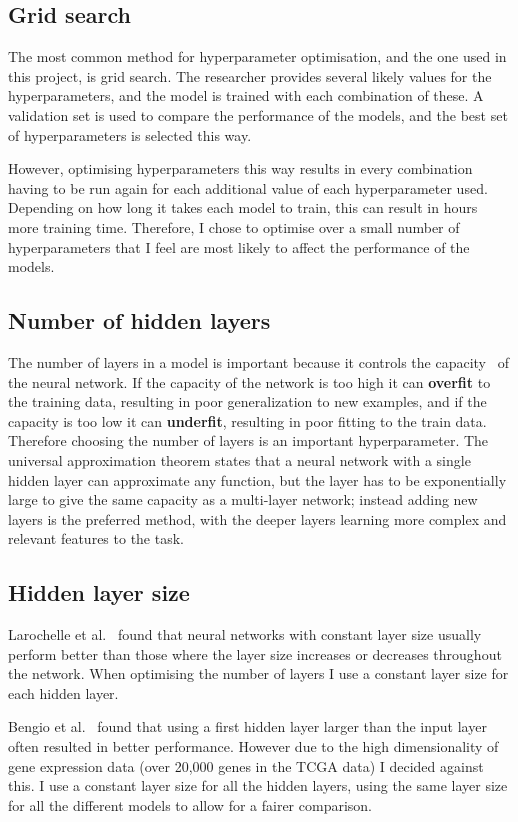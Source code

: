 \documentclass[12pt,a4paper,twoside,openright]{report}
\begin{document}
\subsection{Grid search}
The most common method for hyperparameter optimisation, and the one used in this project, is grid search. The researcher provides several 
likely values for the hyperparameters, and the model is trained with each combination of these. A validation set is used to compare the
performance of the models, and the best set of hyperparameters is selected this way.

However, optimising hyperparameters this way results in every combination having to be run again for each additional value of each
hyperparameter used. Depending on how long it takes each model to train, this can result in hours more training time. 
Therefore, I chose to optimise over a small number of hyperparameters that I feel are most likely to affect the performance of the models.

\subsection{Number of hidden layers}
The number of layers in a model is important because it controls the capacity~\cite{Goodfellow-et-al-2016} of the neural network. If the 
capacity of the network is too high it can \textbf{overfit} to the training data, resulting in poor generalization to new examples, and if the capacity is 
too low it can \textbf{underfit}, resulting in poor fitting to the train data. Therefore choosing the number of layers is an important hyperparameter.
The universal approximation theorem states that a neural network with a single hidden layer can approximate any function, but the layer 
has to be exponentially large to give the same capacity as a multi-layer network; instead adding new layers is the preferred method, 
with the deeper layers learning more complex and relevant features to the task.

\subsection{Hidden layer size}
Larochelle et al.~\cite{DBLP:journals/jmlr/LarochelleBLL09} found that neural networks with constant layer size usually perform better than
those where the layer size increases or decreases throughout the network. When optimising the number of layers I use a constant layer size
for each hidden layer.

Bengio et al.~\cite{DBLP:series/lncs/Bengio12} found that using a first hidden layer larger than the input layer often resulted in 
better performance. However due to the high dimensionality of gene expression data (over 20,000 genes in the TCGA data) I decided against 
this. I use a constant layer size for all the hidden layers, using the same layer size for all the different models to allow for a fairer
comparison.
\end{document}
